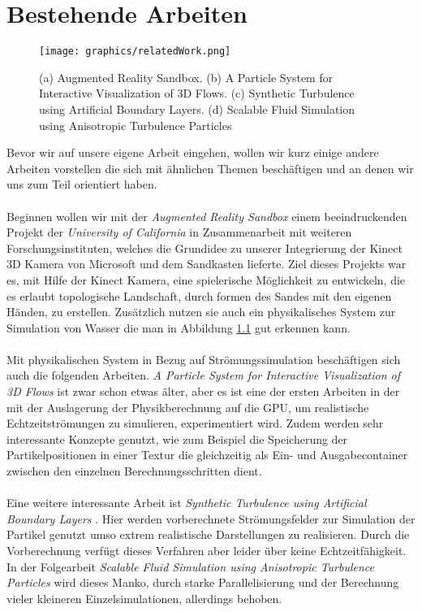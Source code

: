 \chapter{Bestehende Arbeiten}
\begin{Spacing}{\mylinespace}
\begin{figure}[h!]
	\centering
	\texttt{[image: graphics/relatedWork.png]}
	\caption{(a) Augmented Reality Sandbox. (b) A Particle System
for Interactive Visualization of 3D Flows. (c) Synthetic Turbulence using Artificial Boundary Layers. (d) Scalable Fluid Simulation using Anisotropic Turbulence Particles}
	\label{fig:relatedWork}
\end{figure}
Bevor wir auf unsere eigene Arbeit eingehen, wollen wir kurz einige andere Arbeiten vorstellen die sich mit ähnlichen Themen beschäftigen und an denen wir uns zum Teil orientiert haben.
\\\\
Beginnen wollen wir mit der \textit{Augmented Reality Sandbox} \cite{Kreylos2010} einem beeindruckenden Projekt der \textit{University of California} in Zusammenarbeit mit weiteren Forschungsinstituten, welches die Grundidee zu unserer Integrierung der Kinect 3D Kamera von Microsoft und dem Sandkasten lieferte. Ziel dieses Projekts war es, mit Hilfe der Kinect Kamera, eine spielerische Möglichkeit zu entwickeln, die es erlaubt topologische Landschaft, durch formen des Sandes mit den eigenen Händen, zu erstellen. Zusätzlich nutzen sie auch ein physikalisches System zur Simulation von Wasser die man in Abbildung \ref{fig:relatedWork} gut erkennen kann.
\\\\
Mit physikalischen System in Bezug auf Strömungssimulation beschäftigen sich auch die folgenden Arbeiten. \textit{A Particle System
for Interactive Visualization of 3D Flows} \cite{Krueger2005} ist zwar schon etwas älter, aber es ist eine der ersten Arbeiten in der mit der Auslagerung der Physikberechnung auf die GPU, um realistische Echtzeitströmungen zu simulieren, experimentiert wird. Zudem werden sehr interessante Konzepte genutzt, wie zum Beispiel die Speicherung der Partikelpositionen in einer Textur die gleichzeitig als Ein- und Ausgabecontainer zwischen den einzelnen Berechnungsschritten dient.
\\\\
Eine weitere interessante Arbeit ist \textit{Synthetic Turbulence using Artificial Boundary Layers} \cite{Pfaff2009}. Hier werden vorberechnete Strömungsfelder zur Simulation der Partikel genutzt umso extrem realistische Darstellungen zu realisieren. Durch die Vorberechnung verfügt dieses Verfahren aber leider über keine Echtzeitfähigkeit. In der Folgearbeit \textit{Scalable Fluid Simulation using Anisotropic Turbulence Particles} \cite{Pfaff2010} wird dieses Manko, durch starke Parallelisierung und der Berechnung vieler kleineren Einzelsimulationen, allerdings behoben.



\end{Spacing}
\newpage
\clearpage
